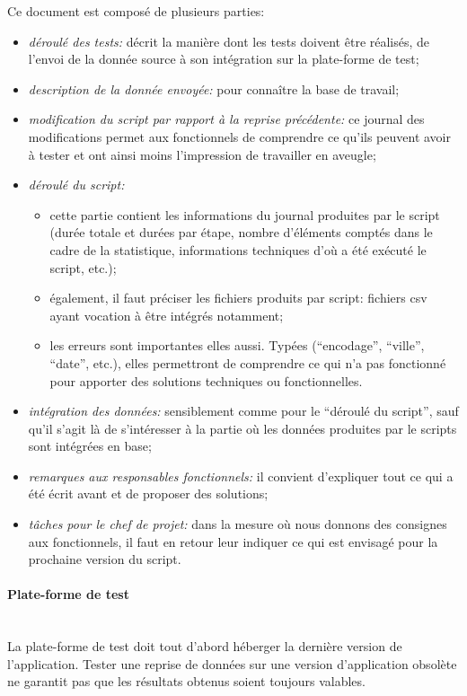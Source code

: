 \documentclass{book}
\newcommand{\myparagraph}[1]{\paragraph{#1}\mbox{}\\}
\begin{document}
Ce document est composé de plusieurs parties:
\begin{itemize}
 \item \textit{déroulé des tests:} décrit la manière dont les tests doivent être réalisés, de l'envoi de la donnée source à son intégration sur la plate-forme de test;
 \item \textit{description de la donnée envoyée:} pour connaître la base de travail;
 \item \textit{modification du script par rapport à la reprise précédente:} ce journal des modifications permet aux \gls{fonctionnels} de comprendre ce qu'ils peuvent avoir à tester et ont ainsi moins l'impression de travailler en aveugle;
 \item \textit{déroulé du script:}
 \begin{itemize}
  \item cette partie contient les informations du journal produites par le script (durée totale et durées par étape, nombre d'éléments comptés dans le cadre de la statistique, informations techniques d'où a été exécuté le script, etc.);
  \item également, il faut préciser les fichiers produits par script: fichiers \gls{csv} ayant vocation à être intégrés notamment;
  \item les erreurs sont importantes elles aussi. Typées (``encodage'', ``ville'', ``date'', etc.), elles permettront de comprendre ce qui n'a pas fonctionné pour apporter des solutions techniques ou fonctionnelles.
 \end{itemize}
 \item \textit{intégration des données:} sensiblement comme pour le ``déroulé du script'', sauf qu'il s'agit là de s'intéresser à la partie où les données produites par le scripts sont intégrées en base;
 \item \textit{remarques aux responsables \gls{fonctionnels}:} il convient d'expliquer tout ce qui a été écrit avant et de proposer des solutions;
 \item \textit{tâches pour le chef de projet:} dans la mesure où nous donnons des consignes aux \gls{fonctionnels}, il faut en retour leur indiquer ce qui est envisagé pour la prochaine version du script.
\end{itemize}
    
\myparagraph{Plate-forme de test}

La plate-forme de test doit tout d'abord héberger la dernière version de l'application. Tester une reprise de données sur une version d'application obsolète ne garantit pas que les résultats obtenus soient toujours valables.
\end{document}
